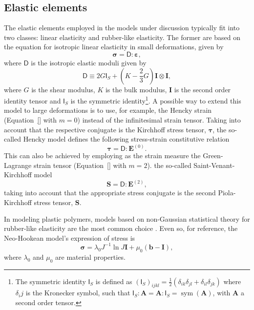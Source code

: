 \subsection{Elastic elements}

The elastic elements employed in the models under discussion typically fit into two classes: linear elasticity and rubber-like elasticity.
The former are based on the equation for isotropic linear elasticity in small deformations, given by
\begin{equation}
	\bm \sigma=\bm{\mathsf D}:\bm \varepsilon,
\end{equation}
where $\bm{\mathsf D}$ is the isotropic elastic moduli given by
\begin{equation}
\bm{\mathsf D}\equiv 2 G \bm{\mathsf I}_S+\left(K-\frac{2}{3} G\right) \mathbf I \otimes \mathbf I ,
\end{equation}
where $G$ is the shear modulus, $K$ is the bulk modulus, $\mathbf I$ is the second order identity tensor and $\bm{\mathsf I}_S$ is the symmetric identity\footnote{The symmetric identity $\bm{\mathsf I}_S$ is defined as $(\bm{\mathsf I}_S)_{ijkl} =\frac{1}{2}(\delta_{ik}\delta_{jl} + \delta_{il}\delta_{jk})$ where $\delta_ij$ is the Kronecker symbol, such that $\bm{\mathsf I}_S: \mathbf A = \mathbf A: \bm{\mathsf I}_S = \operatorname{sym} (\mathbf A)$, with $\mathbf A$ a second order tensor.}.
A possible way to extend this model to large deformations is to use, for example, the Hencky strain (Equation~\eqref{} with $m=0$) instead of the infinitesimal strain tensor.
Taking into account that the respective conjugate is the Kirchhoff stress tensor, $\bm \tau$, the so-called Hencky model defines the following stress-strain constitutive relation
\begin{equation}
	\label{eq:hencky_model}
	\pmb \tau=\bm{\mathsf D}:\mathbf E^{(0)}.
\end{equation}
This can also be achieved by employing as the strain measure the Green-Lagrange strain tensor (Equation~\eqref{} with $m=2$). the so-called Saint-Venant-Kirchhoff model
\begin{equation}
	\label{eq:saint_venant_kirchhoff}
	\mathbf S = \bm{\mathsf D}: \mathbf E^{(2)},
\end{equation}
taking into account that the appropriate stress conjugate is the second Piola-Kirchhoff stress tensor, $\mathbf S$.

In modeling plastic polymers, models based on non-Gaussian statistical theory for rubber-like elasticity are the most common choice \citep{holzapfelNonlinearSolidMechanics2000}.
Even so, for reference, the Neo-Hookean model's expression of stress is
\begin{equation}
  \label{eq:neo_hookean_model}
	\bm \sigma = \lambda_0 J^{-1}\ln J \mathbf{I}+\mu_0\left(\mathbf{b}-\mathbf{I}\right),
\end{equation}
where $\lambda_0$ and $\mu_0$ are material properties.

